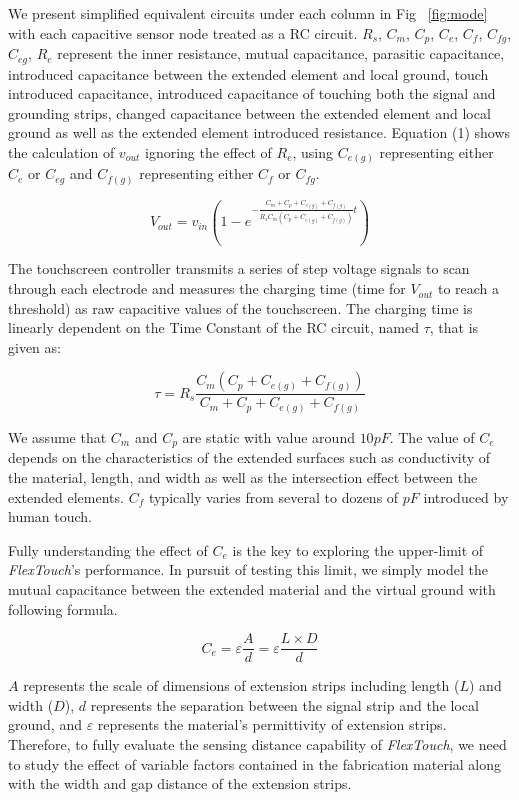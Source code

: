 We present simplified equivalent circuits under each column in Fig ~\ref{fig:mode} with each capacitive sensor node treated as a RC circuit. $R_{s}$, $C_{m}$, $C_{p}$, $C_{e}$, $C_{f}$, $C_{fg}$,$C_{eg}$, $R_{e}$ represent the inner resistance, mutual capacitance, parasitic capacitance, introduced capacitance between the extended element and local ground, touch introduced capacitance, introduced capacitance of touching both the signal and grounding strips, changed capacitance between the extended element and local ground as well as the extended element introduced resistance. Equation (1) shows the calculation of $v_{out}$ ignoring the effect of $R_{e}$, using $C_{e(g)}$ representing either $C_{e}$ or $C_{eg}$ and $C_{f(g)}$ representing either $C_{f}$ or $C_{fg}$.

\begin{equation}
    V_{out} = v_{in}(1-e^{-\frac{C_{m} + C_{p} + C_{e(g)} + C_{f(g)}}{R_{s}C_{m}(C_{p} + C_{e(g)} + C_{f(g)})}t})
\end{equation}


The touchscreen controller transmits a series of step voltage signals to scan through each electrode and measures the charging time (time for $V_{out}$ to reach a threshold) as raw capacitive values of the touchscreen. The charging time is linearly dependent on the Time Constant of the RC circuit, named $\tau$, that is given as:

\begin{equation}
    \tau = R_{s}\frac{C_{m}(C_{p} + C_{e(g)} + C_{f(g)})}{C_{m} + C_{p} + C_{e(g)} + C_{f(g)}}
\end{equation}

 
We assume that $C_{m}$ and $C_{p}$ are static with value around $10pF$. The value of $C_{e}$ depends on the characteristics of the extended surfaces such as conductivity of the material, length, and width as well as the intersection effect between the extended elements. $C_{f}$ typically varies from several to dozens of $pF$ introduced by human touch. 

Fully understanding the effect of $C_{e}$ is the key to exploring the upper-limit of \textit{FlexTouch}'s performance. In pursuit of testing this limit, we simply model the mutual capacitance between the extended material and the virtual ground with following formula.

\begin{equation}
    C_{e} = \varepsilon \frac{A}{d} = \varepsilon \frac{L \times D}{d} \tag{3}
\end{equation}

$A$ represents the scale of dimensions of extension strips including length ($L$) and width ($D$), $d$ represents the separation between the signal strip and the local ground, and $\varepsilon$ represents the material's permittivity of extension strips. Therefore, to fully evaluate the sensing distance capability of \textit{FlexTouch}, we need to study the effect of variable factors contained in the fabrication material along with the width and gap distance of the extension strips.